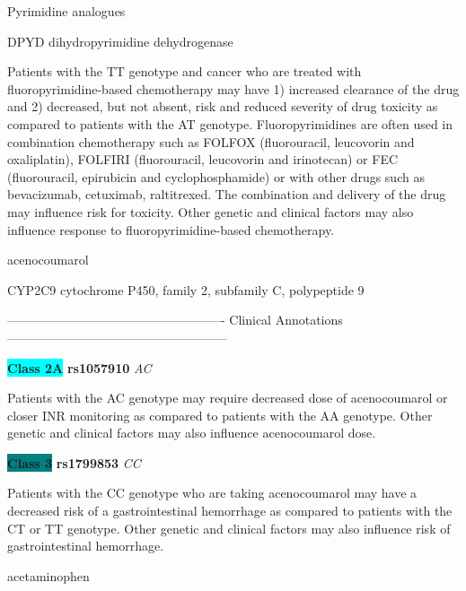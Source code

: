 \documentclass{resume} %
\begin{document}
\begin{rSection}{ Pyrimidine analogues }
\begin{rSubsection}{ DPYD }{ dihydropyrimidine dehydrogenase }{}{}
\item[] Patients with the TT genotype and cancer who are treated with fluoropyrimidine-based chemotherapy may have 1) increased clearance of the drug and 2) decreased, but not absent, risk and reduced severity of drug toxicity as compared to patients with the AT genotype. Fluoropyrimidines are often used in combination chemotherapy such as FOLFOX (fluorouracil, leucovorin and oxaliplatin), FOLFIRI (fluorouracil, leucovorin and irinotecan) or FEC (fluorouracil, epirubicin and cyclophosphamide) or with other drugs such as bevacizumab, cetuximab, raltitrexed. The combination and delivery of the drug may influence risk for toxicity. Other genetic and clinical factors may also influence response to fluoropyrimidine-based chemotherapy.
\end{rSubsection}

\end{rSection}\begin{rSection}{ acenocoumarol }
\item[]

\begin{rSubsection}{ CYP2C9 }{ cytochrome P450, family 2, subfamily C, polypeptide 9 }{}{}
\item[]

\item[] ---------------------------------------------------- Clinical Annotations -----------------------------------------------------\newline
\item \textbf{\colorbox{cyan} {Class 2A}} \textbf{ rs1057910 } \textit{ AC }
\item[] Patients with the AC genotype may require decreased dose of acenocoumarol or closer INR monitoring as compared to patients with the AA genotype. Other genetic and clinical factors may also influence acenocoumarol dose.\item \textbf{\colorbox{teal} {Class 3}} \textbf{ rs1799853 } \textit{ CC }
\item[] Patients with the CC genotype who are taking acenocoumarol may have a decreased risk of a gastrointestinal hemorrhage as compared to patients with the CT or TT genotype. Other genetic and clinical factors may also influence risk of gastrointestinal hemorrhage.
\end{rSubsection}

\end{rSection}\begin{rSection}{ acetaminophen }
\item[]


\end{rSection}
\end{document}
